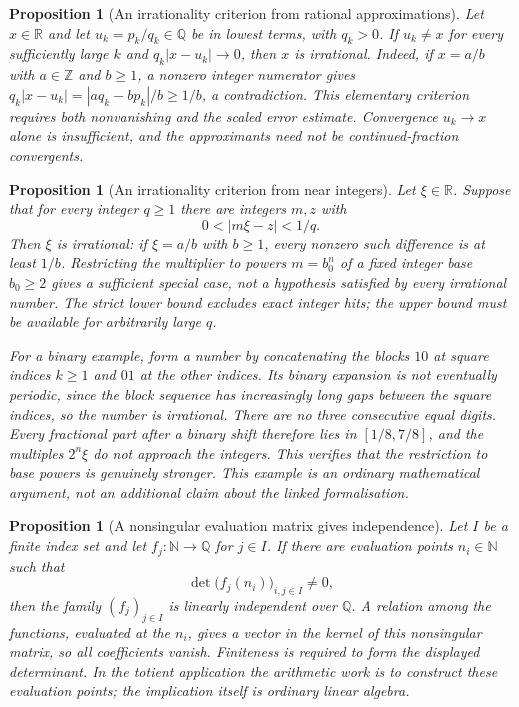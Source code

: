 \documentclass[11pt]{article}
\theoremstyle{plain}
\newtheorem{prop}[thm]{Proposition}
\theoremstyle{definition}
\theoremstyle{remark}
\begin{document}
\begin{prop}[An irrationality criterion from rational approximations]\label{catalogue:cert:d1}
Let $x\in\mathbb R$ and let $u_k=p_k/q_k\in\mathbb Q$ be in lowest
terms, with $q_k>0$. If $u_k\ne x$ for every sufficiently large $k$ and
$q_k|x-u_k|\to0$, then $x$ is irrational. Indeed, if $x=a/b$ with
$a\in\mathbb Z$ and $b\ge1$, a nonzero integer numerator gives
$q_k|x-u_k|=|a q_k-b p_k|/b\ge1/b$, a contradiction.
This elementary criterion requires both nonvanishing and the scaled
error estimate. Convergence $u_k\to x$ alone is insufficient, and the
approximants need not be continued-fraction convergents.
\end{prop}

\begin{prop}[An irrationality criterion from near integers]\label{catalogue:cert:d2}
Let $\xi\in\mathbb R$. Suppose that for every integer $q\ge1$ there
are integers $m,z$ with
\[
 0<|m\xi-z|<1/q.
\]
Then $\xi$ is irrational: if $\xi=a/b$ with $b\ge1$, every nonzero
such difference is at least $1/b$. Restricting the multiplier to powers
$m=b_0^n$ of a fixed integer base $b_0\ge2$ gives a sufficient special
case, not a hypothesis satisfied by every irrational number.
The strict lower bound excludes exact integer hits; the upper bound must
be available for arbitrarily large $q$.

For a binary example, form a number by concatenating the blocks $10$ at
square indices $k\ge1$ and $01$ at the other indices. Its binary expansion
is not eventually periodic, since the block sequence has increasingly
long gaps between the square indices, so the number is irrational. There
are no three consecutive equal digits. Every fractional part after a
binary shift therefore lies in $[1/8,7/8]$, and the multiples $2^n\xi$
do not approach the integers. This verifies that the restriction to
base powers is genuinely stronger. This example is an ordinary mathematical
argument, not an additional claim about the linked formalisation.
\end{prop}

\begin{prop}[A nonsingular evaluation matrix gives independence]\label{catalogue:cert:d3}
Let $I$ be a finite index set and let $f_j:\mathbb N\to\mathbb Q$
for $j\in I$. If there are evaluation points $n_i\in\mathbb N$ such that
\[
 \det\bigl(f_j(n_i)\bigr)_{i,j\in I}\ne0,
\]
then the family $(f_j)_{j\in I}$ is linearly independent over $\mathbb Q$.
A relation among the functions, evaluated at the $n_i$, gives a vector
in the kernel of this nonsingular matrix, so all coefficients vanish.
Finiteness is required to form the displayed determinant. In the totient
application the arithmetic work is to construct these evaluation points;
the implication itself is ordinary linear algebra.
\end{prop}
\end{document}
